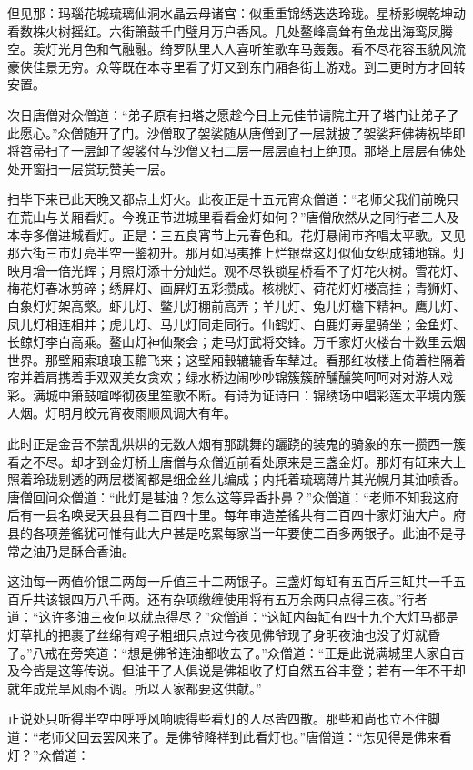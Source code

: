 \documentclass[12pt,UTF8]{ctexbook}
\begin{document}
{	但见那：玛瑙花城琉璃仙洞水晶云母诸宫：似重重锦绣迭迭玲珑。星桥影幌乾坤动看数株火树摇红。六街箫鼓千门璧月万户香风。几处鳌峰高耸有鱼龙出海鸾凤腾空。羡灯光月色和气融融。绮罗队里人人喜听笙歌车马轰轰。看不尽花容玉貌风流豪侠佳景无穷。众等既在本寺里看了灯又到东门厢各街上游戏。到二更时方才回转安置。
	
	次日唐僧对众僧道：“弟子原有扫塔之愿趁今日上元佳节请院主开了塔门让弟子了此愿心。”众僧随开了门。沙僧取了袈裟随从唐僧到了一层就披了袈裟拜佛祷祝毕即将笤帚扫了一层卸了袈裟付与沙僧又扫二层一层层直扫上绝顶。那塔上层层有佛处处开窗扫一层赏玩赞美一层。
	
	扫毕下来已此天晚又都点上灯火。此夜正是十五元宵众僧道：“老师父我们前晚只在荒山与关厢看灯。今晚正节进城里看看金灯如何？”唐僧欣然从之同行者三人及本寺多僧进城看灯。正是：三五良宵节上元春色和。花灯悬闹市齐唱太平歌。又见那六街三市灯亮半空一鉴初升。那月如冯夷推上烂银盘这灯似仙女织成铺地锦。灯映月增一倍光辉；月照灯添十分灿烂。观不尽铁锁星桥看不了灯花火树。雪花灯、梅花灯春冰剪碎；绣屏灯、画屏灯五彩攒成。核桃灯、荷花灯灯楼高挂；青狮灯、白象灯灯架高檠。虾儿灯、鳖儿灯棚前高弄；羊儿灯、兔儿灯檐下精神。鹰儿灯、凤儿灯相连相并；虎儿灯、马儿灯同走同行。仙鹤灯、白鹿灯寿星骑坐；金鱼灯、长鲸灯李白高乘。鳌山灯神仙聚会；走马灯武将交锋。万千家灯火楼台十数里云烟世界。那壁厢索琅琅玉韂飞来；这壁厢毂辘辘香车辇过。看那红妆楼上倚着栏隔着帘并着肩携着手双双美女贪欢；绿水桥边闹吵吵锦簇簇醉醺醺笑呵呵对对游人戏彩。满城中箫鼓喧哗彻夜里笙歌不断。有诗为证诗曰：锦绣场中唱彩莲太平境内簇人烟。灯明月皎元宵夜雨顺风调大有年。
	
	此时正是金吾不禁乱烘烘的无数人烟有那跳舞的躧跷的装鬼的骑象的东一攒西一簇看之不尽。却才到金灯桥上唐僧与众僧近前看处原来是三盏金灯。那灯有缸来大上照着玲珑剔透的两层楼阁都是细金丝儿编成；内托着琉璃薄片其光幌月其油喷香。唐僧回问众僧道：“此灯是甚油？怎么这等异香扑鼻？”众僧道：“老师不知我这府后有一县名唤旻天县县有二百四十里。每年审造差徭共有二百四十家灯油大户。府县的各项差徭犹可惟有此大户甚是吃累每家当一年要使二百多两银子。此油不是寻常之油乃是酥合香油。
	
	这油每一两值价银二两每一斤值三十二两银子。三盏灯每缸有五百斤三缸共一千五百斤共该银四万八千两。还有杂项缴缠使用将有五万余两只点得三夜。”行者道：“这许多油三夜何以就点得尽？”众僧道：“这缸内每缸有四十九个大灯马都是灯草扎的把裹了丝绵有鸡子粗细只点过今夜见佛爷现了身明夜油也没了灯就昏了。”八戒在旁笑道：“想是佛爷连油都收去了。”众僧道：“正是此说满城里人家自古及今皆是这等传说。但油干了人俱说是佛祖收了灯自然五谷丰登；若有一年不干却就年成荒旱风雨不调。所以人家都要这供献。”
	
	正说处只听得半空中呼呼风响唬得些看灯的人尽皆四散。那些和尚也立不住脚道：“老师父回去罢风来了。是佛爷降祥到此看灯也。”唐僧道：“怎见得是佛来看灯？”众僧道：
	
}
\end{document}
